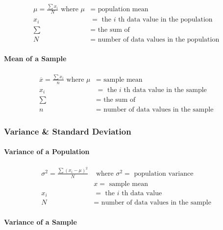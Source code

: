 \begin{equation}
	\begin{aligned} \mu=\frac{\sum x_{i}}{N} \text { where } \mu &=\text { population mean } \\ x_{i} &=\text { the } i \text { th data value in the population } \\ \sum &=\text { the sum of } \\ N &=\text { number of data values in the population } \end{aligned}
\end{equation}

\paragraph{Mean of a Sample}
\begin{equation}
	\begin{aligned} \overline{x}=\frac{\sum x_{i}}{n} \text { where } \mu &=\text { sample mean } \\ x_{i} &=\text { the } i \text { th data value in the sample } \\ \sum &=\text { the sum of } \\ n &=\text { number of data values in the sample } \end{aligned}
\end{equation}

\subsubsection{Variance \& Standard Deviation}
\paragraph{Variance of a Population}

\begin{equation}
	\begin{aligned} \sigma^{2}=\frac{{\sum\left (x_{i}-\mu\right )}^{2}}{N} & \text { where } \sigma^{2}=\text { population variance } \\ & x=\text { sample mean } \\ x_{i} &=\text { the } i \text { th data value } \\ N &=\text { number of data values in the sample } \end{aligned}
\end{equation}

\paragraph{Variance of a Sample}

